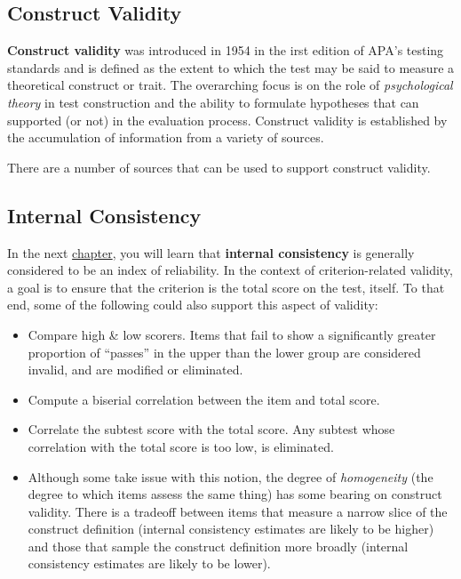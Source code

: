 \documentclass[
  english,
]{book}
\providecommand{\tightlist}{%
  \setlength{\itemsep}{0pt}\setlength{\parskip}{0pt}}
\begin{document}
\hypertarget{construct-validity}{%
\subsection{Construct Validity}\label{construct-validity}}

\textbf{Construct validity} was introduced in 1954 in the irst edition of APA's testing standards and is defined as the extent to which the test may be said to measure a theoretical construct or trait. The overarching focus is on the role of \emph{psychological theory} in test construction and the ability to formulate hypotheses that can supported (or not) in the evaluation process. Construct validity is established by the accumulation of information from a variety of sources.

There are a number of sources that can be used to support construct validity.

\hypertarget{internal-consistency}{%
\subsection{Internal Consistency}\label{internal-consistency}}

In the next \protect\hyperlink{rxx}{chapter}, you will learn that \textbf{internal consistency} is generally considered to be an index of reliability. In the context of criterion-related validity, a goal is to ensure that the criterion is the total score on the test, itself. To that end, some of the following could also support this aspect of validity:

\begin{itemize}
\tightlist
\item
  Compare high \& low scorers. Items that fail to show a significantly greater proportion of ``passes'' in the upper than the lower group are considered invalid, and are modified or eliminated.
\item
  Compute a biserial correlation between the item and total score.\\
\item
  Correlate the subtest score with the total score. Any subtest whose correlation with the total score is too low, is eliminated.
\item
  Although some take issue with this notion, the degree of \emph{homogeneity} (the degree to which items assess the same thing) has some bearing on construct validity. There is a tradeoff between items that measure a narrow slice of the construct definition (internal consistency estimates are likely to be higher) and those that sample the construct definition more broadly (internal consistency estimates are likely to be lower).
\end{itemize}
\end{document}
